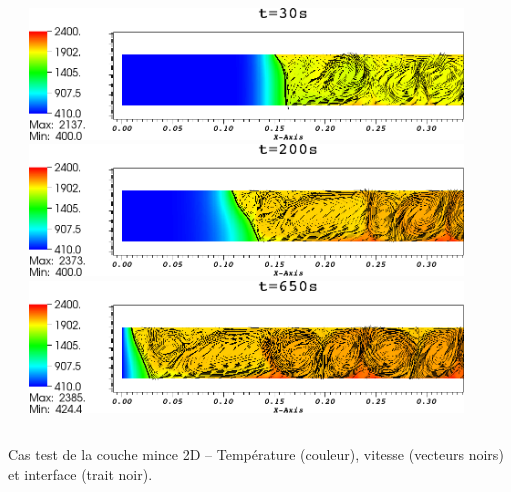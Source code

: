 \documentclass{beamer}
\begin{document}
\begin{frame}
\begin{columns}[c]
\begin{column}{0.5 \textwidth}
\begin{center}
\end{center}
\end{column}
    \begin{column}{0.5 \textwidth}
\includegraphics[width=0.9\textwidth]{Figures/CoucheMince0300000.png}\\
\includegraphics[width=0.9\textwidth]{Figures/CoucheMince2000000.png}\\
\includegraphics[width=0.9\textwidth]{Figures/CoucheMince6500000.png}

   \end{column}
   \end{columns}
\center Cas test de la couche mince 2D -- Température (couleur), vitesse (vecteurs noirs) et interface (trait noir).

\end{frame}
\end{document}
